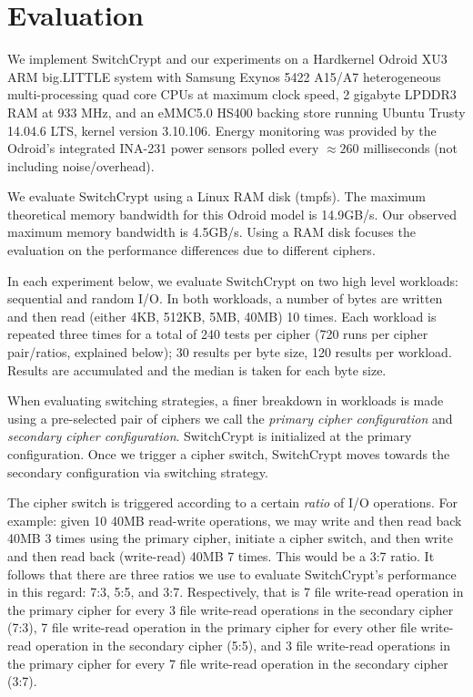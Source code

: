 \section{Evaluation} \label{sec:sc-evaluation}

We implement SwitchCrypt and our experiments on a Hardkernel Odroid XU3 ARM
big.LITTLE system with Samsung Exynos 5422 A15/A7 heterogeneous multi-processing
quad core CPUs at maximum clock speed, 2 gigabyte LPDDR3 RAM at 933 MHz, and an
eMMC5.0 HS400 backing store running Ubuntu Trusty 14.04.6 LTS, kernel version
3.10.106. Energy monitoring was provided by the Odroid's integrated INA-231
power sensors polled every $\approx{260}$ milliseconds (not including
noise/overhead).

We evaluate SwitchCrypt using a Linux RAM disk (tmpfs). The maximum theoretical
memory bandwidth for this Odroid model is 14.9GB/s\@. Our observed maximum
memory bandwidth is 4.5GB/s. Using a RAM disk focuses the evaluation on the
performance differences due to different ciphers.

In each experiment below, we evaluate SwitchCrypt on two high level workloads:
sequential and random I/O. In both workloads, a number of bytes are written and
then read (either 4KB, 512KB, 5MB, 40MB) 10 times. Each workload is repeated
three times for a total of 240 tests per cipher (720 runs per cipher
pair/ratios, explained below); 30 results per byte size, 120 results per
workload. Results are accumulated and the median is taken for each byte size.

When evaluating switching strategies, a finer breakdown in workloads is made
using a pre-selected pair of ciphers we call the \emph{primary cipher
configuration} and \emph{secondary cipher configuration}. SwitchCrypt is
initialized at the primary configuration. Once we trigger a cipher switch,
SwitchCrypt moves towards the secondary configuration via switching strategy. 

The cipher switch is triggered according to a certain \emph{ratio} of I/O
operations. For example: given 10 40MB read-write operations, we may write and
then read back 40MB 3 times using the primary cipher, initiate a cipher switch,
and then write and then read back (write-read) 40MB 7 times. This would be a 3:7
ratio. It follows that there are three ratios we use to evaluate SwitchCrypt's
performance in this regard: 7:3, 5:5, and 3:7. Respectively, that is 7 file
write-read operation in the primary cipher for every 3 file write-read
operations in the secondary cipher (7:3), 7 file write-read operation in the
primary cipher for every other file write-read operation in the secondary cipher
(5:5), and 3 file write-read operations in the primary cipher for every 7 file
write-read operation in the secondary cipher (3:7).

